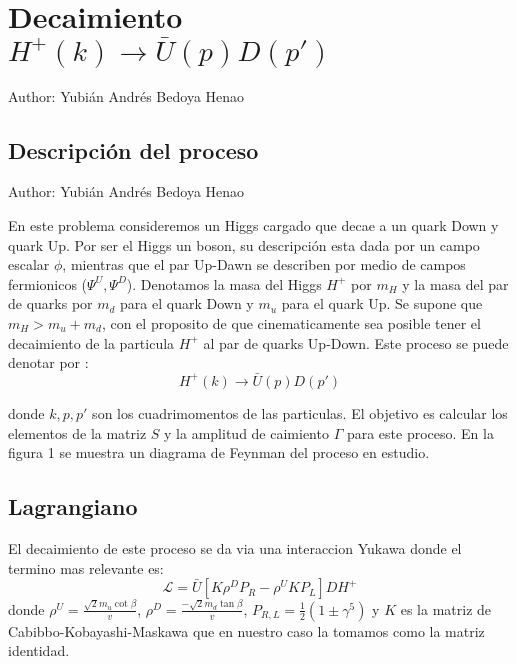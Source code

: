 
\chapter{Decaimiento $H^{+}(k)\longrightarrow \bar{U}(p)D(p')$}

Author: Yubián Andrés Bedoya Henao

\section{Descripción del proceso}

Author: Yubián Andrés Bedoya Henao

En este problema consideremos un Higgs cargado que decae a un quark Down y quark Up. Por ser el Higgs un boson, su descripción esta dada por un campo escalar $\phi$, mientras que el par Up-Dawn se describen por medio de campos fermionicos ($\Psi^{U},\Psi^{D}$).
Denotamos la masa del Higgs $H^{+}$ por $m_H$ y la masa del par de quarks por $m_d$ para el quark Down y $m_u$ para el quark Up. Se supone que $m_H > m_u + m_d$, con el proposito de que cinematicamente sea posible tener el decaimiento de la particula $H^{+}$ al par de quarks Up-Down.
Este proceso se puede denotar por :
\[
 H^{+}(k)\longrightarrow \bar{U}(p)D(p')
\]

donde $k,p,p'$ son los cuadrimomentos de las particulas. El objetivo es calcular los elementos de la matriz $S$ y la amplitud de caimiento $\Gamma$ para este proceso.
En la figura 1 se muestra un diagrama de Feynman del proceso en estudio.

\section{Lagrangiano}
El decaimiento de este proceso se da via una interaccion Yukawa donde el termino mas relevante es:
\begin{equation}
 \mathcal{L}=\bar{U}[K \rho^{D} P_R- \rho^{U} K P_L]D H^{+}
\end{equation}
donde $\rho^{U}=\frac{\sqrt{2}m_u\cot\beta}{v}$, $\rho^{D}=\frac{-\sqrt{2}m_d\tan\beta}{v}$, $P_{R,L}=\frac{1}{2}(1\pm\gamma^{5})$ y $K$ es la matriz de Cabibbo-Kobayashi-Maskawa que en nuestro caso la tomamos como la matriz identidad.
